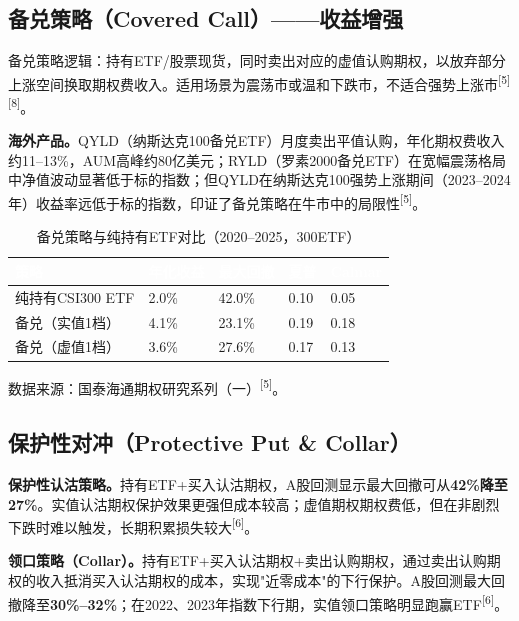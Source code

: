 \documentclass[10pt,a4paper,twocolumn]{ctexart}
\begin{document}
\subsection{备兑策略（Covered Call）——收益增强}

备兑策略逻辑：持有ETF/股票现货，同时卖出对应的虚值认购期权，以放弃部分上涨空间换取期权费收入。适用场景为震荡市或温和下跌市，不适合强势上涨市\textsuperscript{[5][8]}。

\textbf{海外产品。}QYLD（纳斯达克100备兑ETF）月度卖出平值认购，年化期权费收入约11--13\%，AUM高峰约80亿美元；RYLD（罗素2000备兑ETF）在宽幅震荡格局中净值波动显著低于标的指数；但QYLD在纳斯达克100强势上涨期间（2023--2024年）收益率远低于标的指数，印证了备兑策略在牛市中的局限性\textsuperscript{[5]}。

\begin{table}[H]
\centering\scriptsize
\caption{备兑策略与纯持有ETF对比（2020--2025，300ETF）}
\label{tab:coveredcall}
\renewcommand{\arraystretch}{1.25}
\setlength{\tabcolsep}{3pt}
\begin{tabularx}{\columnwidth}{@{}XC{1.0cm}C{1.0cm}C{0.8cm}C{0.9cm}@{}}
\toprule
{}
\textcolor{white}{\textbf{策略}} &
\textcolor{white}{\textbf{年化收益}} &
\textcolor{white}{\textbf{最大回撤}} &
\textcolor{white}{\textbf{夏普}} &
\textcolor{white}{\textbf{Calmar}} \\
\midrule
纯持有CSI300 ETF  & 2.0\%  & 42.0\% & 0.10 & 0.05 \\
备兑（实值1档）   & 4.1\%  & 23.1\% & 0.19 & 0.18 \\
备兑（虚值1档）   & 3.6\%  & 27.6\% & 0.17 & 0.13 \\
\bottomrule
\end{tabularx}
\end{table}

{\scriptsize 数据来源：国泰海通期权研究系列（一）\textsuperscript{[5]}。}

\subsection{保护性对冲（Protective Put \& Collar）}

\textbf{保护性认沽策略。}持有ETF+买入认沽期权，A股回测显示最大回撤可从\textbf{42\%降至27\%}。实值认沽期权保护效果更强但成本较高；虚值期权期权费低，但在非剧烈下跌时难以触发，长期积累损失较大\textsuperscript{[6]}。

\textbf{领口策略（Collar）。}持有ETF+买入认沽期权+卖出认购期权，通过卖出认购期权的收入抵消买入认沽期权的成本，实现"近零成本"的下行保护。A股回测最大回撤降至\textbf{30\%--32\%}；在2022、2023年指数下行期，实值领口策略明显跑赢ETF\textsuperscript{[6]}。
\end{document}
